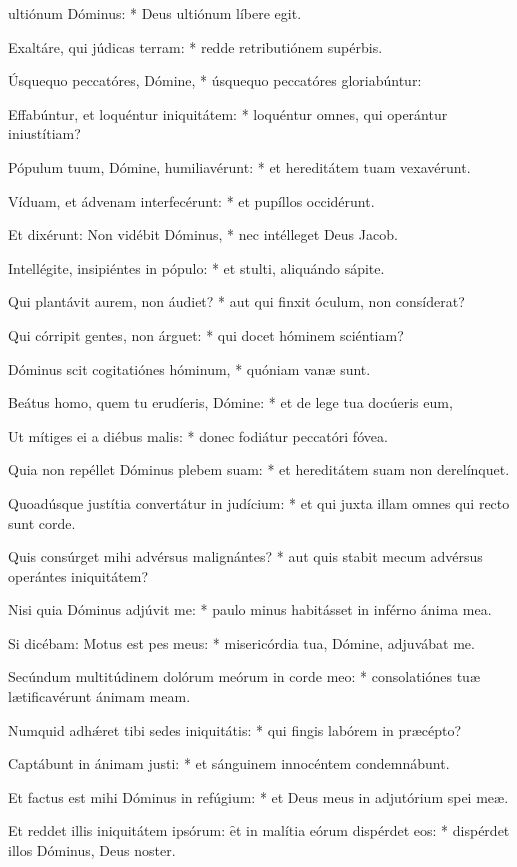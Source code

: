 \begin{psalmus}

	 ultiónum Dóminus: * Deus ultiónum líbere egit.

	Exaltáre, qui júdicas terram: * redde retributiónem supérbis.
 
	Úsquequo peccatóres, Dómine, * úsquequo peccatóres gloriabúntur:

	Effabúntur, et loquéntur iniquitátem: * loquéntur omnes, qui operántur iniustítiam?
 
	Pópulum tuum, Dómine, humiliavérunt: * et hereditátem tuam vexavérunt.
 
	Víduam, et ádvenam interfecérunt: * et pupíllos occidérunt.
 
	Et dixérunt: Non vidébit Dóminus, * nec intélleget Deus Jacob.
 
	Intellégite, insipiéntes in pópulo: * et stulti, aliquándo sápite.
 
	Qui plantávit aurem, non áudiet? * aut qui finxit óculum, non consíderat?
 
	Qui córripit gentes, non árguet: * qui docet hóminem sciéntiam?
 
	Dóminus scit cogitatiónes hóminum, * quóniam vanæ sunt.
 
	Beátus homo, quem tu erudíeris, Dómine: * et de lege tua docúeris eum,
 
	Ut mítiges ei a diébus malis: * donec fodiátur peccatóri fóvea.
 
	Quia non repéllet Dóminus plebem suam: * et hereditátem suam non derelínquet.
 
	Quoadúsque justítia convertátur in judícium: * et qui juxta illam omnes qui recto sunt corde.
 
	Quis consúrget mihi advérsus malignántes? * aut quis stabit mecum advérsus operántes iniquitátem?
 
	Nisi quia Dóminus adjúvit me: * paulo minus habitásset in inférno ánima mea.
 
	Si dicébam: Motus est pes meus: * misericórdia tua, Dómine, adjuvábat me.
 
	Secúndum multitúdinem dolórum meórum in corde meo: * consolatiónes tuæ lætificavérunt ánimam meam.
 
	Numquid adhǽret tibi sedes iniquitátis: * qui fingis labórem in præcépto?
 
	Captábunt in ánimam justi: * et sánguinem innocéntem condemnábunt.
 
	Et factus est mihi Dóminus in refúgium: * et Deus meus in adjutórium spei meæ.
 
	Et reddet illis iniquitátem ipsórum: \f et in malítia eórum dispérdet eos: * dispérdet illos Dóminus, Deus noster.

\end{psalmus}

